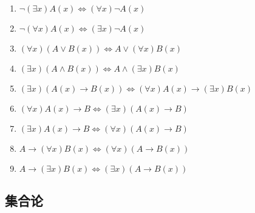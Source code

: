 \begin{enumerate}
\begin{enumerate}[label={$E_{\arabic*}$}]
\item $\neg(\exists x)A(x) \Leftrightarrow (\forall x)\neg A(x)$
\item $\neg(\forall x)A(x) \Leftrightarrow (\exists x)\neg A(x)$
\item $(\forall x)(A\vee B(x)) \Leftrightarrow A\vee(\forall x)B(x)$
\item $(\exists x)(A\wedge B(x)) \Leftrightarrow A\wedge(\exists x)B(x)$
\item $(\exists x)(A(x)\to B(x)) \Leftrightarrow (\forall x)A(x)\to(\exists x)B(x)$
\item $(\forall x)A(x)\to B \Leftrightarrow (\exists x)(A(x)\to B)$
\item $(\exists x)A(x)\to B \Leftrightarrow (\forall x)(A(x)\to B)$
\item $A\to(\forall x)B(x) \Leftrightarrow (\forall x)(A\to B(x))$
\item $A\to(\exists x)B(x) \Leftrightarrow (\exists x)(A\to B(x))$
\end{enumerate}

\end{enumerate}


\subsection{集合论}

